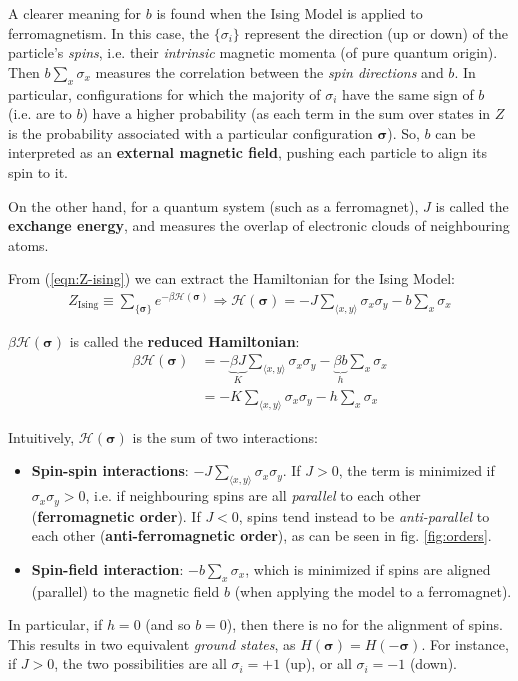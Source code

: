 \documentclass[../../main.tex]{subfiles}
\begin{document}
A clearer meaning for $b$ is found when the Ising Model is applied to ferromagnetism. In this case, the $\{\sigma_i\}$ represent the direction (up or down) of the particle's \textit{spins}, i.e. their \textit{intrinsic} magnetic momenta (of pure quantum origin). Then $b \sum_x \sigma_x$ measures the correlation between the \textit{spin directions} and $b$. In particular, configurations for which the majority of $\sigma_i$ have the same sign of $b$ (i.e. are  to $b$) have a higher probability (as each term in the sum over states in $Z$ is the probability associated with a particular configuration $\bm{\sigma}$). So, $b$ can be interpreted as an \textbf{external magnetic field}, pushing each particle to align its spin to it.

On the other hand, for a quantum system (such as a ferromagnet), $J$ is called the \textbf{exchange energy}, and measures the overlap of electronic clouds of neighbouring atoms. 

\medskip

From (\ref{eqn:Z-ising}) we can extract the Hamiltonian for the Ising Model:
\begin{align}\label{eqn:H-ising}
    Z_{\mathrm{Ising}} \equiv \sum_{\{\bm{\sigma}\}} e^{-\beta \mathcal{H}(\bm{\sigma})} \Rightarrow \mathcal{H}(\bm{\sigma}) = -J \sum_{\langle x,y \rangle} \sigma_x \sigma_y - b \sum_x \sigma_x
\end{align}

$\beta \mathcal{H}(\bm{\sigma})$ is called the \textbf{reduced Hamiltonian}:
\begin{align*}
    \beta \mathcal{H}(\bm{\sigma}) &= -\underbrace{\beta J}_{K} \sum_{\langle x,y \rangle} \sigma_x \sigma_y -\underbrace{\beta b}_{h} \sum_x \sigma_x \\
    &= -K \sum_{\langle x,y \rangle} \sigma_x \sigma_y - h \sum_x \sigma_x
\end{align*}  


Intuitively, $\mathcal{H}(\bm{\sigma})$ is the sum of two interactions:
\begin{itemize}
    \item \textbf{Spin-spin interactions}: $-J \sum_{\langle x,y \rangle} \sigma_x \sigma_y$. If $J > 0$, the term is minimized if $\sigma_x \sigma_y > 0$, i.e. if neighbouring spins are all \textit{parallel} to each other (\textbf{ferromagnetic order}). If $J < 0$, spins tend instead to be \textit{anti-parallel} to each other (\textbf{anti-ferromagnetic order}), as can be seen in fig. \ref{fig:orders}. 
    \item \textbf{Spin-field interaction}: $-b \sum_x \sigma_x$, which is minimized if spins are aligned (parallel) to the magnetic field $b$ (when applying the model to a ferromagnet).  
\end{itemize}
In particular, if $h = 0$ (and so $b=0$), then there is no  for the alignment of spins. This results in two equivalent \textit{ground states}, as $H(\bm{\sigma}) = H(-\bm{\sigma})$. For instance, if $J > 0$, the two possibilities are all $\sigma_i = +1$ (up), or all $\sigma_i = -1$ (down).
\end{document}
